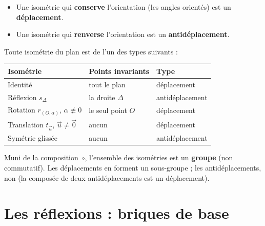 \begin{definition}
	\begin{itemize}[label=\textbullet]
		\item Une isométrie qui \textbf{conserve} l'orientation (les angles
		orientés) est un \textbf{déplacement}.
		\item Une isométrie qui \textbf{renverse} l'orientation est un
		\textbf{antidéplacement}.
	\end{itemize}
\end{definition}

\begin{theoreme}
	Toute isométrie du plan est de l'un des types suivants :

	\begin{center}
	\renewcommand{\arraystretch}{1.35}
	\begin{tabular}{>{\raggedright\arraybackslash}p{2.9cm}
	                >{\centering\arraybackslash}p{2.9cm}
	                >{\centering\arraybackslash}p{2.6cm}}
	\hline
	\textbf{Isométrie} & \textbf{Points invariants} & \textbf{Type} \\
	\hline
	Identité & tout le plan & déplacement \\
	Réflexion $s_\Delta$ & la droite $\Delta$ & antidéplacement \\
	Rotation $r_{(O,\alpha)}$, $\alpha\not\equiv 0$ & le seul point $O$ & déplacement \\
	Translation $t_{\vec u}$, $\vec u\neq\vec 0$ & aucun & déplacement \\
	Symétrie glissée & aucun & antidéplacement \\
	\hline
	\end{tabular}
	\end{center}
\end{theoreme}

\begin{attention}
	Muni de la composition~$\circ$, l'ensemble des isométries est un
	\textbf{groupe} (non commutatif). Les déplacements en forment un
	sous-groupe ; les antidéplacements, non (la composée de deux
	antidéplacements est un déplacement).
\end{attention}


\section{Les réflexions : briques de base}

